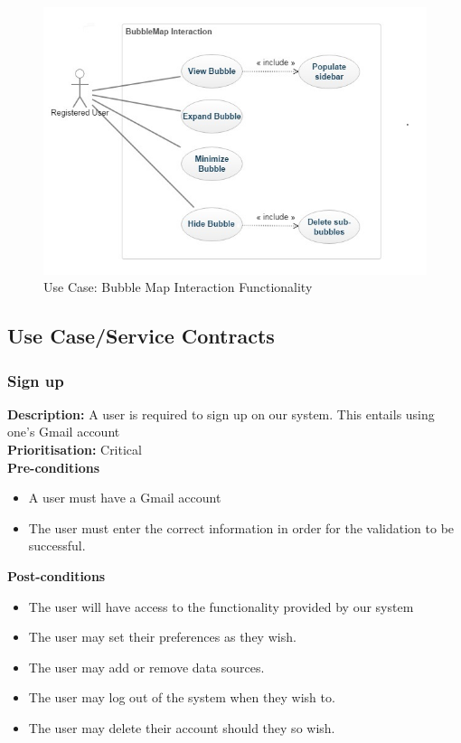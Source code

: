\documentclass[hidelinks,english]{article}
\begin{document}
		\begin{figure}
			\includegraphics[width=\linewidth]{BubbleMap Interaction.jpg}
			\caption{Use Case: Bubble Map Interaction Functionality}
		\end{figure}
		
		\subsection{Use Case/Service Contracts}
		\subsubsection{Sign up}
	\textbf{Description:}  A user is required to sign up on our system. This entails using one's Gmail account
	\\
    \textbf{Prioritisation:} Critical\\
    
    
      \textbf{Pre-conditions}
    \begin{itemize}
        \item A user must have a Gmail account
        \item The user must enter the correct information in order for the validation to be successful.
    \end{itemize}
    
    \textbf{Post-conditions}
     \begin{itemize}
        \item The user will have access to the functionality provided by our system
        \item The user may set their preferences as they wish.
        \item The user may add or remove data sources.
        \item The user may log out of the system when they wish to.
        \item The user may delete their account should they so wish.
    \end{itemize}
    
\end{document}
